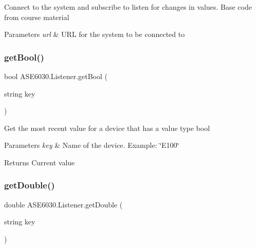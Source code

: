 Connect to the system and subscribe to listen for changes in values. Base code from course material 


\begin{DoxyParams}{Parameters}
{\em url} & U\+RL for the system to be connected to\\
\hline
\end{DoxyParams}
\mbox{\label{class_a_s_e6030_1_1_listener_ac6b8dbf1ed6fd6c3ce0911beef9759ce}} 
\subsubsection{\texorpdfstring{get\+Bool()}{getBool()}}
{\footnotesize\ttfamily bool A\+S\+E6030.\+Listener.\+get\+Bool (\begin{DoxyParamCaption}\item[{string}]{key }\end{DoxyParamCaption})\hspace{0.3cm}{\ttfamily [inline]}}



Get the most recent value for a device that has a value type bool 


\begin{DoxyParams}{Parameters}
{\em key} & Name of the device. Example\+: \char`\"{}\+E100\char`\"{}\\
\hline
\end{DoxyParams}
\begin{DoxyReturn}{Returns}
Current value
\end{DoxyReturn}
\mbox{\label{class_a_s_e6030_1_1_listener_af8474a0fcd293043899a51cbb3e05d44}} 
\subsubsection{\texorpdfstring{get\+Double()}{getDouble()}}
{\footnotesize\ttfamily double A\+S\+E6030.\+Listener.\+get\+Double (\begin{DoxyParamCaption}\item[{string}]{key }\end{DoxyParamCaption})\hspace{0.3cm}{\ttfamily [inline]}}



